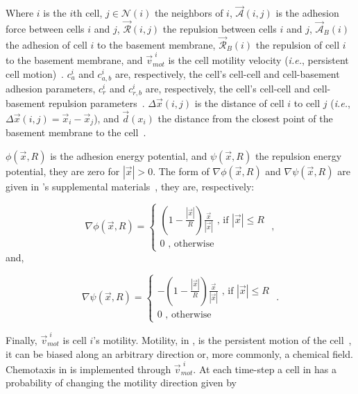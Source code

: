 \noindent Where $i$ is the $i$th cell, $j\in\mathcal{N}(i)$ the neighbors of $i$, $\Vec{\mathcal{A}}(i, j)$ is the adhesion force between cells $i$ and $j$, $\Vec{\mathcal{R}}(i, j)$ the repulsion between cells $i$ and $j$, $\Vec{\mathcal{A}}_B(i)$ the adhesion of cell $i$ to the basement membrane, $\Vec{\mathcal{R}}_B(i)$ the repulsion of cell $i$ to the basement membrane, and $\Vec{v}^{\,\,i}_{mot}$ is the cell motility velocity (\textit{i.e.}, persistent cell motion)~\cite{ghaffarizadeh_physicell_2018}. $c_a^i$ and $c_{a,b}^i$ are, respectively, the cell's cell-cell and cell-basement adhesion parameters,  $c_r^i$ and $c_{r,b}^i$ are, respectively, the cell's cell-cell and cell-basement repulsion parameters~\cite{ghaffarizadeh_physicell_2018}. $\Delta\Vec{x}(i, j)$ is the distance of cell $i$ to cell $j$ (\textit{i.e.}, $\Delta\Vec{x}(i, j) = \Vec{x}_i - \Vec{x}_j$), and $\Vec{d}(x_i)$ the distance from the closest point of the basement membrane to the cell~\cite{ghaffarizadeh_physicell_2018}. 

$\phi(\Vec{x}, R)$ is the adhesion energy potential, and $\psi(\Vec{x}, R)$ the repulsion energy potential, they are  zero for $|\Vec{x}|>0$. The form of $\nabla\phi(\Vec{x}, R)$ and $\nabla\psi(\Vec{x}, R)$ are given in \psc's supplemental materials~\cite{ghaffarizadeh_physicell_2018}, they are, respectively:

\begin{equation}\label{eq:abm:physi-ad-pot}
    \nabla\phi(\Vec{x}, R) = \begin{cases}
        \left(1 - \frac{|\Vec{x}|}{R} \right)\frac{\Vec{x}}{|\Vec{x}|}\,\,\text{, if }|\Vec{x}|\leq R\\
        0\,\,\text{, otherwise}
    \end{cases}\,\,,
\end{equation}
\noindent and,

\begin{equation}\label{eq:abm:physi-rep-pot}
    \nabla\psi(\Vec{x}, R) = \begin{cases}
        -\left(1 - \frac{|\Vec{x}|}{R} \right)\frac{\Vec{x}}{|\Vec{x}|}\,\,\text{, if }|\Vec{x}|\leq R\\
        0\,\,\text{, otherwise}
    \end{cases}\,\,.
\end{equation}

Finally, $\Vec{v}^{\,\,i}_{mot}$ is cell $i$'s motility. Motility, in \psc, is the persistent motion of the cell~\cite{ghaffarizadeh_physicell_2018}, it can be biased along an arbitrary direction or, more commonly, a chemical field. Chemotaxis in \pscs is implemented through $\Vec{v}^{\,\,i}_{mot}$. At each time-step a cell in \pscs has a probability of changing the motility direction given by

